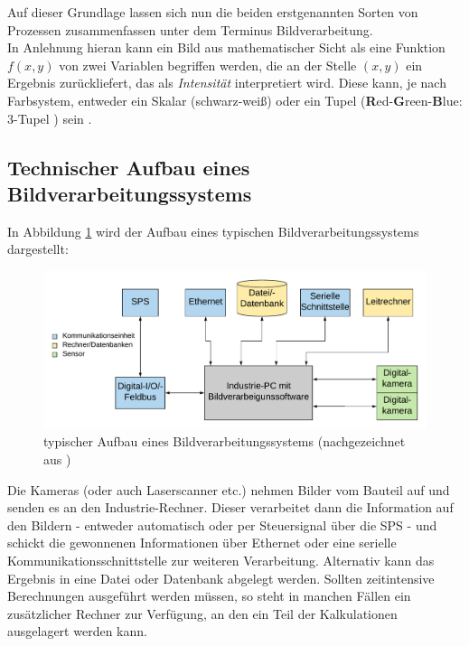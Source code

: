 			Auf dieser Grundlage lassen sich nun die beiden erstgenannten Sorten von Prozessen zusammenfassen unter dem Terminus Bildverarbeitung. \\
			In Anlehnung hieran kann ein Bild aus mathematischer Sicht als eine Funktion $f(x, y)$ von zwei Variablen begriffen werden, die an der Stelle $(x, y)$ ein Ergebnis zurückliefert, das als \textit{Intensität} interpretiert wird. Diese kann, je nach Farbsystem, entweder ein Skalar (schwarz-weiß) oder ein Tupel (\textbf{R}ed-\textbf{G}reen-\textbf{B}lue: 3-Tupel \cite{rgb-info}) sein \cite[S. 50]{gonzalez-woods}. \\
			
		\subsection{Technischer Aufbau eines Bildverarbeitungssystems}
		\label{sub:tech-struc}
			In Abbildung \ref{fig:indust-imgproc} wird der Aufbau eines typischen Bildverarbeitungssystems dargestellt:
			\begin{figure}[H]
				\includegraphics[width=\linewidth]{Industrielles-Bildverarbeitungssystem}
				\caption{typischer Aufbau eines Bildverarbeitungssystems (nachgezeichnet aus \cite[S. 7]{indust-imgproc})}
				\label{fig:indust-imgproc}
			\end{figure}
			Die Kameras (oder auch Laserscanner etc.) nehmen Bilder vom Bauteil auf und senden es an den Industrie-Rechner. Dieser verarbeitet dann die Information auf den Bildern - entweder automatisch oder per Steuersignal über die SPS - und schickt die gewonnenen Informationen über Ethernet oder eine serielle Kommunikationsschnittstelle zur weiteren Verarbeitung. Alternativ kann das Ergebnis in eine Datei oder Datenbank abgelegt werden. Sollten zeitintensive Berechnungen ausgeführt werden müssen, so steht in manchen Fällen ein zusätzlicher Rechner zur Verfügung, an den ein Teil der Kalkulationen ausgelagert werden kann.
		\vfill

